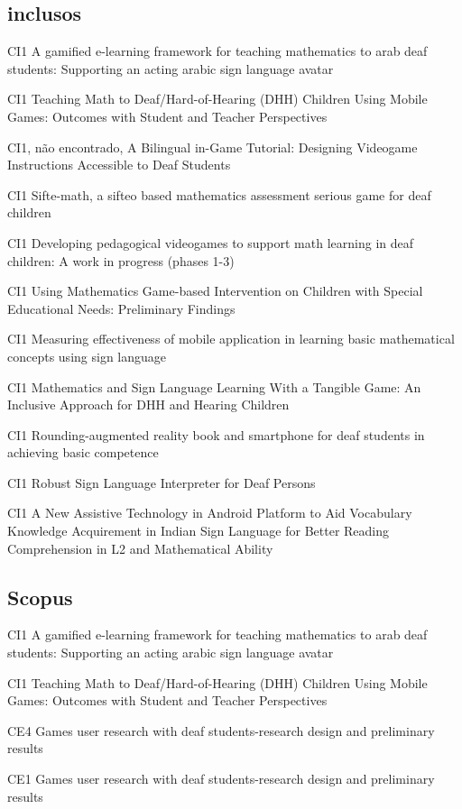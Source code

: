 \subsection{inclusos}

CI1 A gamified e-learning framework for teaching mathematics to arab deaf students: Supporting an acting arabic sign language avatar

CI1 Teaching Math to Deaf/Hard-of-Hearing (DHH) Children Using Mobile Games: Outcomes with Student and Teacher Perspectives

CI1, não encontrado, A Bilingual in-Game Tutorial: Designing Videogame Instructions Accessible to Deaf Students

CI1 Sifte-math, a sifteo based mathematics assessment serious game for deaf children

CI1 Developing pedagogical videogames to support math learning in deaf children: A work in progress (phases 1-3)

CI1 Using Mathematics Game-based Intervention on Children with Special Educational Needs: Preliminary Findings

CI1 Measuring effectiveness of mobile application in learning basic mathematical concepts using sign language

CI1 Mathematics and Sign Language Learning With a Tangible Game: An Inclusive Approach for DHH and Hearing Children

CI1 Rounding-augmented reality book and smartphone for deaf students in achieving basic competence

CI1 Robust Sign Language Interpreter for Deaf Persons

CI1 A New Assistive Technology in Android Platform to Aid Vocabulary Knowledge Acquirement in Indian Sign Language for Better Reading Comprehension in L2 and Mathematical Ability

\subsection{Scopus}

CI1 A gamified e-learning framework for teaching mathematics to arab deaf students: Supporting an acting arabic sign language avatar

CI1 Teaching Math to Deaf/Hard-of-Hearing (DHH) Children Using Mobile Games: Outcomes with Student and Teacher Perspectives

CE4 Games user research with deaf students-research design and preliminary results

CE1 Games user research with deaf students-research design and preliminary results


